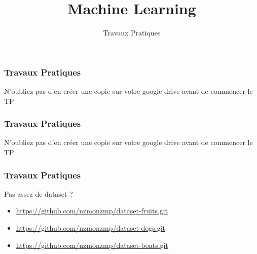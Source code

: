 \documentclass{formation}
\title{Machine Learning}
\subtitle{Travaux Pratiques}
\begin{document}
\maketitle

\begin{frame}
  \frametitle{Travaux Pratiques}
  N'oubliez pas d'en créer une copie sur votre google drive avant de commencer le TP
  \begin{center}
  \end{center}
\end{frame}

\begin{frame}
  \frametitle{Travaux Pratiques}
  N'oubliez pas d'en créer une copie sur votre google drive avant de commencer le TP
  \begin{center}
  \end{center}
\end{frame}

\begin{frame}
  \frametitle{Travaux Pratiques}
  Pas assez de dataset ?
  \begin{itemize}
  \item \url{https://github.com/nzmonzmp/dataset-fruits.git}
  \item \url{https://github.com/nzmonzmp/dataset-dogs.git}
  \item \url{https://github.com/nzmonzmp/dataset-boats.git}
  \end{itemize}
\end{frame}
\end{document}
